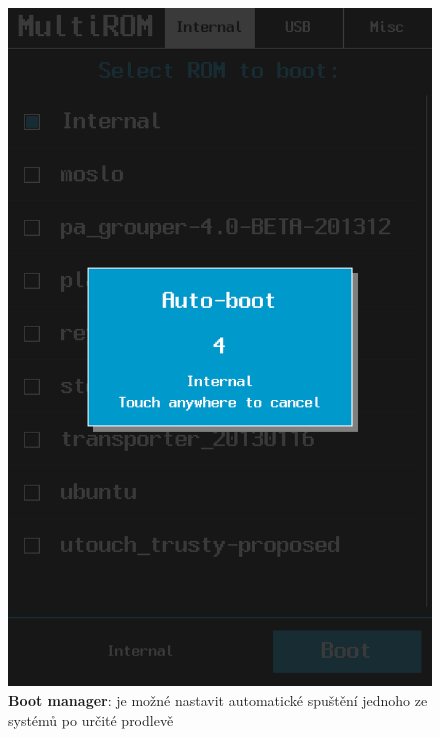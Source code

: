 \documentclass[12pt, a4paper, oneside]{article}
\newcommand{\B}{\textbf} %
\begin{document}
\begin{figure}[H]
\begin{center}
 \includegraphics[height=\textheight-40]{img/boot_manager_autoboot.png}
\caption{\B{Boot manager}: je možné nastavit automatické spuštění jednoho ze systémů po určité prodlevě}
\end{center}
\end{figure}
\end{document}
